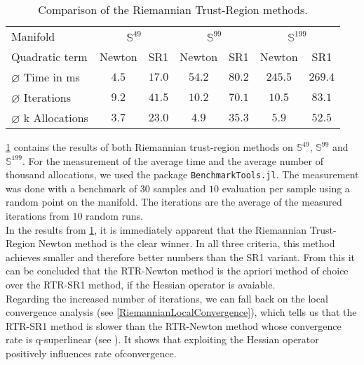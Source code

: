 \begin{table}[H]
    \centering
        \begin{tabular}{lcccccc}
            \toprule
            Manifold & \multicolumn{2}{c}{$\mathbb{S}^{49}$}& \multicolumn{2}{c}{$\mathbb{S}^{99}$} & \multicolumn{2}{c}{$\mathbb{S}^{199}$}\\ 
            \cmidrule(lr){2-3} \cmidrule(lr){4-5} \cmidrule(lr){6-7}
            Quadratic term & Newton & SR1 & Newton & SR1 & Newton & SR1 \\ 

            $\varnothing$ Time in ms & $4.5$ & $17.0$ & $54.2$ & $80.2$ & $245.5$ & $269.4$\\ 
            $\varnothing$ Iterations & $9.2$ & $41.5$ & $10.2$ & $70.1$ & $10.5$ & $83.1$ \\
            $\varnothing$ k Allocations& $3.7$ & $23.0$ & $4.9$ & $35.3$ & $5.9$ & $52.5$ \\
            \bottomrule
        \end{tabular}
    \caption{Comparison of the Riemannian Trust-Region methods.} \label{tab:Results}
\end{table}

\cref{tab:Results} contains the results of both Riemannian trust-region methods on $\mathbb{S}^{49}$, $\mathbb{S}^{99}$ and $\mathbb{S}^{199}$. For the measurement of the average time and the average number of thousand allocations, we used the package \lstinline!BenchmarkTools.jl!. The measurement was done with a benchmark of $30$ samples and $10$ evaluation per sample using a random point on the manifold. The iterations are the average of the measured iterations from $10$ random runs. \\
In the results from \cref{tab:Results}, it is immediately apparent that the Riemannian Trust-Region Newton method is the clear winner. In all three criteria, this method achieves smaller and therefore better numbers than the SR1 variant. From this it can be concluded that the RTR-Newton method is the apriori method of choice over the RTR-SR1 method, if the Hessian operator is avaiable. \\
Regarding the increased number of iterations, we can fall back on the local convergence analysis (see \cref{RiemannianLocalConvergence}), which tells us that the RTR-SR1 method is slower than the RTR-Newton method whose convergence rate is q-superlinear (see \cite[Theorem~4.13]{AbsilBakerGallivan:2007}). It shows that exploiting the Hessian operator positively influences rate ofconvergence. \\ 

